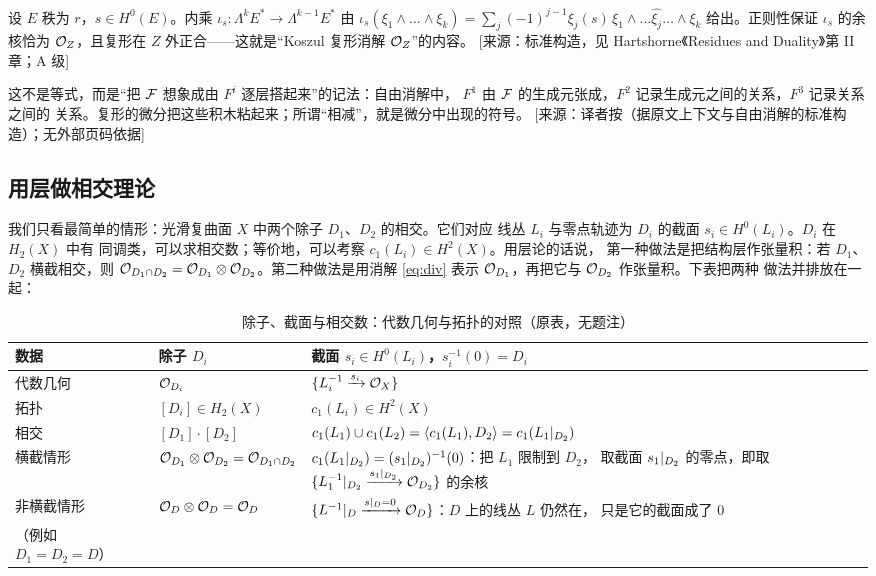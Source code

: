 \begin{yizhu}\label{yizhu:koszul}
设 $E$ 秩为 $r$，$s\in H^0(E)$。内乘 $\iota_s\colon\Lambda^kE^*\to\Lambda^{k-1}E^*$
由 $\iota_s(\xi_1\wedge\ldots\wedge\xi_k)=\sum_j(-1)^{j-1}\xi_j(s)\,
\xi_1\wedge\ldots\widehat{\xi_j}\ldots\wedge\xi_k$ 给出。正则性保证
$\iota_s$ 的余核恰为 $\mathcal{O}_Z$，且复形在 $Z$ 外正合——这就是“Koszul 复形消解
$\mathcal{O}_Z$”的内容。
[来源：标准构造，见 Hartshorne《Residues and Duality》第 II 章；A 级]
\end{yizhu}

\begin{yizhu}[$\F=F^1-F^2+F^3-\ldots$ 该怎么读]
这不是等式，而是“把 $\mathcal{F}$ 想象成由 $F^i$ 逐层搭起来”的记法：自由消解中，
$F^1$ 由 $\mathcal{F}$ 的生成元张成，$F^2$ 记录生成元之间的关系，$F^3$ 记录关系之间的
关系。复形的微分把这些积木粘起来；所谓“相减”，就是微分中出现的符号。
[来源：译者按（据原文上下文与自由消解的标准构造）；无外部页码依据]
\end{yizhu}

\subsection*{用层做相交理论}

我们只看最简单的情形：光滑复曲面 $X$ 中两个除子 $D_1$、$D_2$ 的相交。它们对应
线丛 $L_i$ 与零点轨迹为 $D_i$ 的截面 $s_i\in H^0(L_i)$。$D_i$ 在 $H_2(X)$ 中有
同调类，可以求相交数；等价地，可以考察 $c_1(L_i)\in H^2(X)$。用层论的话说，
第一种做法是把结构层作张量积：若 $D_1$、$D_2$ 横截相交，则
$\mathcal{O}_{D_1\cap D_2}=\mathcal{O}_{D_1}\otimes\mathcal{O}_{D_2}$。第二种做法是用消解
\eqref{eq:div} 表示 $\mathcal{O}_{D_1}$，再把它与 $\mathcal{O}_{D_2}$ 作张量积。下表把两种
做法并排放在一起：

\begin{table}[htbp]
\centering\small
\renewcommand{\arraystretch}{1.5}
\begin{tabular}{@{}p{2.4cm}p{4.6cm}p{6.8cm}@{}}
\toprule
数据 & 除子 $D_i$ & 截面 $s_i\in H^0(L_i)$，$s_i^{-1}(0)=D_i$\\
\midrule
代数几何 & $\mathcal{O}_{D_i}$ & $\{L_i^{-1}\xrightarrow{s_i}\mathcal{O}_X\}$\\
拓扑 & $[D_i]\in H_2(X)$ & $c_1(L_i)\in H^2(X)$\\
相交 & $[D_1]\cdot[D_2]$ &
$c_1(L_1)\cup c_1(L_2)=\langle c_1(L_1),D_2\rangle=c_1(L_1\arrowvert_{D_2})$\\
\midrule
横截情形 & $\mathcal{O}_{D_1}\otimes\mathcal{O}_{D_2}=\mathcal{O}_{D_1\cap D_2}$ &
$c_1(L_1\arrowvert_{D_2})=(s_1\arrowvert_{D_2})^{-1}(0)$：把 $L_1$ 限制到 $D_2$，
取截面 $s_1\arrowvert_{D_2}$ 的零点，即取 $\{L_1^{-1}\arrowvert_{D_2}\xrightarrow{s_1\arrowvert_{D_2}}
\mathcal{O}_{D_2}\}$ 的余核\\
\midrule
非横截情形 & $\mathcal{O}_D\otimes\mathcal{O}_D=\mathcal{O}_D$ &
$\{L^{-1}\arrowvert_D\xrightarrow{s\arrowvert_D=0}\mathcal{O}_D\}$：$D$ 上的线丛 $L$ 仍然在，
只是它的截面成了 $0$\\
（例如 $D_1=D_2=D$） & & \\
\bottomrule
\end{tabular}
\caption{除子、截面与相交数：代数几何与拓扑的对照（原表，无题注）}
\label{tab:intersection}
\end{table}

